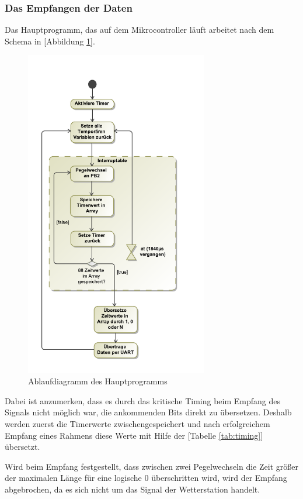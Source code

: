 \documentclass{report}
\begin{document}
\subsubsection{Das Empfangen der Daten}
Das Hauptprogramm, das auf dem Mikrocontroller läuft arbeitet nach dem Schema in [Abbildung \ref{ablauf}].
\begin{figure}[!htb]
    \begin{center}
        \includegraphics[width=8cm]{Bilder/EmpfangsmodulActivity.pdf}
    \end{center}
    \caption{Ablaufdiagramm des Hauptprogramms}
    \label{ablauf}
\end{figure}

Dabei ist anzumerken, dass es durch das kritische Timing beim Empfang des Signals nicht möglich war, die ankommenden Bits direkt zu übersetzen. Deshalb werden zuerst die Timerwerte zwischengespeichert und nach erfolgreichem Empfang eines Rahmens diese Werte mit Hilfe der [Tabelle \ref{tab:timing}] übersetzt. 

Wird beim Empfang festgestellt, dass zwischen zwei Pegelwechseln die Zeit größer der maximalen Länge für eine logische $0$ überschritten wird, wird der Empfang abgebrochen, da es sich nicht um das Signal der Wetterstation handelt.
\end{document}
